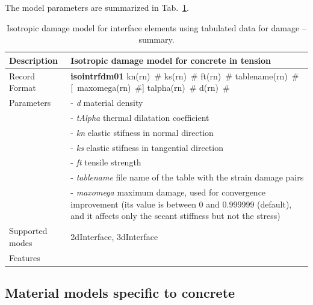 \documentclass[a4paper]{article}
\newcommand{\descitem}[1]{{\noindent \bf #1}}
\newcommand{\elemparam}[2]{{{#1\tiny (#2)}~\#}}
\newcommand{\optelemparam}[2]{[{~\elemparam{#1}{#2}}]}
\newcommand{\param}[1]{{\it #1}}
\begin{document}
The model parameters are summarized in Tab.~\ref{iid_table}. 
\begin{table}[!htb]
  \small
\begin{tabular}{|l|p{9cm}|}
\hline
Description & Isotropic damage model for concrete in tension\\
\hline
Record Format & \descitem{isointrfdm01} 
\elemparam{kn}{rn} \elemparam{ks}{rn} \elemparam{ft}{rn} \elemparam{tablename}{rn} \optelemparam{maxomega}{rn} \elemparam{talpha}{rn} \elemparam{d}{rn}\\
Parameters & - \param{d} material density\\
&- \param{tAlpha} thermal dilatation coefficient\\
&- \param{kn} elastic stifness in normal direction\\
&- \param{ks} elastic stifness in tangential direction\\
&- \param{ft} tensile strength\\
&- \param{tablename} file name of the table with the strain damage pairs\\
&- \param{maxomega} maximum damage, used for convergence improvement
(its value is between 0 and 0.999999 (default), 
and it affects only the secant stiffness but not the stress)\\
Supported modes& 2dInterface, 3dInterface\\
Features & \\
\hline
\end{tabular}
\caption{Isotropic damage model for interface elements  using tabulated data for damage -- summary.}
\label{iid_table}
\end{table}


\subsection{Material models specific to concrete}
\end{document}
